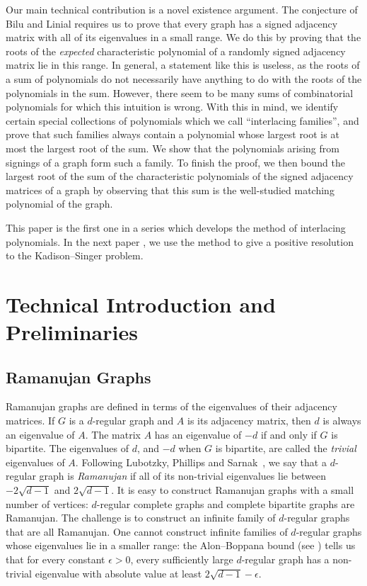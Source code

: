 \documentclass[11pt]{article}
\begin{document}
Our main technical contribution is a novel existence argument.
The conjecture of Bilu and Linial requires us to prove that every 
   graph has a signed adjacency matrix with all of its eigenvalues in a small range.
We do this by proving that the roots of the {\em expected} characteristic polynomial
  of a randomly signed adjacency matrix lie in this range.
In general, a statement like this is useless, as the roots of a sum of polynomials do not necessarily
  have anything to do with the roots of the polynomials in the sum.
However, there seem to be many sums of combinatorial polynomials for which this intuition is wrong.
With this in mind, we identify certain special collections of polynomials which we call ``interlacing families'', and 
  prove that such families always contain a polynomial whose largest root is at most
  the largest root of the sum.
We show that the polynomials arising from signings of a graph form such a family.
To finish the proof, we then bound the largest root of the sum of the characteristic 
  polynomials of the signed adjacency matrices of a graph by observing that this sum 
  is the well-studied matching polynomial of the graph.

This paper is the first one in a series which develops
  the method of interlacing polynomials.
In the next paper \cite{IF2}, we use the method 
  to give a positive resolution to the Kadison--Singer problem. 


\section{Technical Introduction and Preliminaries}
\subsection{Ramanujan Graphs}
Ramanujan graphs are defined in terms of the eigenvalues of their adjacency matrices.
If $G$ is a $d$-regular graph and $A$ is its adjacency matrix, then $d$ is always
  an eigenvalue of $A$.
The matrix $A$ has an eigenvalue of $-d$ if and only if $G$ is bipartite.
The eigenvalues of $d$, and $-d$ when $G$ is bipartite, are called the \textit{trivial} 
  eigenvalues of $A$.
Following Lubotzky, Phillips and Sarnak~\cite{LPS}, we say that a $d$-regular
graph is \textit{Ramanujan} if all of its non-trivial eigenvalues
  lie between $-2\sqrt{d-1}$ and $2 \sqrt{d-1}$.
It is easy to construct Ramanujan graphs with a small number of vertices:
  $d$-regular complete graphs and complete bipartite graphs are Ramanujan.
The challenge is to construct an infinite family of $d$-regular graphs that
  are all Ramanujan.
One cannot construct infinite families of $d$-regular graphs whose eigenvalues
   lie in a smaller range:
  the Alon--Boppana bound (see \cite{nilli}) tells us that
   for every constant $\epsilon > 0$,
   every sufficiently large $d$-regular graph has a 
   non-trivial eigenvalue with absolute value at least
   $2\sqrt{d-1}-\epsilon$.
\end{document}
